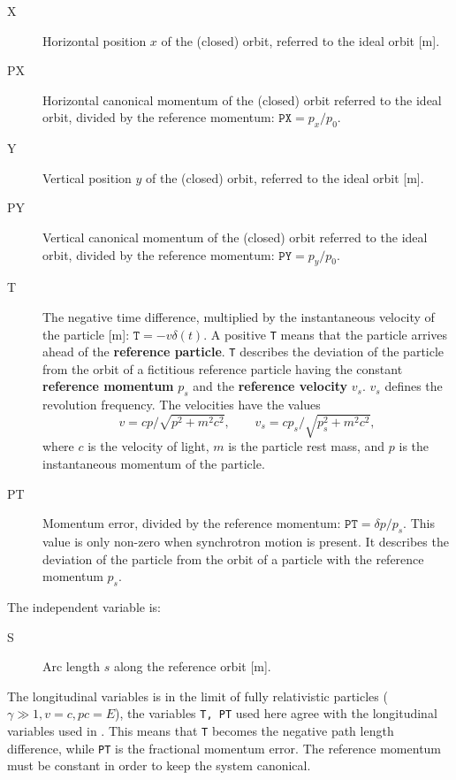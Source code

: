 \begin{description}
\item[X]
  Horizontal position $x$ of the (closed) orbit,
  referred to the ideal orbit [m].

\item[PX]
  Horizontal canonical momentum of the (closed) orbit referred 
  to the ideal orbit, divided by the reference momentum:
  $\mathtt{PX} = p_x / p_0$.

\item[Y]
  Vertical position $y$ of the (closed) orbit,
  referred to the ideal orbit [m].

\item[PY]
  Vertical canonical momentum of the (closed) orbit referred 
  to the ideal orbit, divided by the reference momentum:
  $\mathtt{PY} = p_y / p_0$.

\item[T]
  The negative time difference, 
  multiplied by the instantaneous velocity of the particle [m]:
  $\mathtt{T} = - v \delta(t)$.
  A positive \texttt{T} means that the particle arrives ahead of the 
  \textbf{reference particle}.
  \texttt{T} describes the deviation of the particle from the orbit of 
  a fictitious reference particle having the constant 
  \textbf{reference momentum} $p_s$ and the 
  \textbf{reference velocity} $v_s$.
  $v_s$ defines the revolution frequency.
  The velocities have the values 
  \[
  v = c p / \sqrt{p^2 + m^2 c^2}, \qquad
  v_s = c p_s / \sqrt{p_s^2 + m^2 c^2},
  \]
  where $c$ is the velocity of light, $m$ is the particle rest mass, 
  and $p$ is the instantaneous momentum of the particle.

\item[PT]
  Momentum error, divided by the reference momentum:
  $\mathtt{PT} = \delta p / p_s$.
  This value is only non-zero when synchrotron motion is present.
  It describes the deviation of the particle from the orbit of a
  particle with the reference momentum $p_s$.
\end{description}

The independent variable is:
\begin{description}
\item[S]
  Arc length $s$ along the reference orbit [m].
\end{description}

The longitudinal variables is in the limit of fully relativistic particles
($\gamma \gg 1, v = c, p c = E$),
the variables \texttt{T, PT} used here agree with the longitudinal variables
used in .
This means that \texttt{T} becomes the negative path length difference,
while \texttt{PT} is the fractional momentum error.
The reference momentum must be constant in order to keep the system 
canonical.

